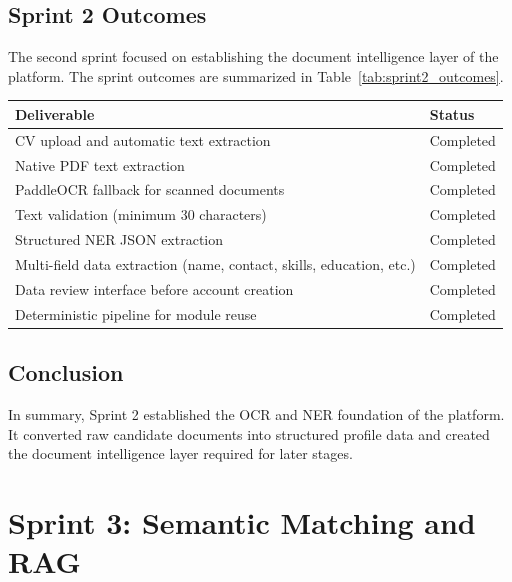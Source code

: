 \subsection{Sprint 2 Outcomes}
\label{sec:sprint2:outcomes}

The second sprint focused on establishing the document intelligence layer of the platform. The sprint outcomes are summarized in Table~\ref{tab:sprint2_outcomes}.

\begin{center}
\label{tab:sprint2_outcomes}
\renewcommand{\arraystretch}{0.8}
\begin{tabular}{|l|l|}
\hline
\rowcolor{gray!20} \textbf{Deliverable} & \textbf{Status} \\
\hline
CV upload and automatic text extraction & Completed \\
\hline
Native PDF text extraction & Completed \\
\hline
PaddleOCR fallback for scanned documents & Completed \\
\hline
Text validation (minimum 30 characters) & Completed \\
\hline
Structured NER JSON extraction & Completed \\
\hline
Multi-field data extraction (name, contact, skills, education, etc.) & Completed \\
\hline
Data review interface before account creation & Completed \\
\hline
Deterministic pipeline for module reuse & Completed \\
\hline
\end{tabular}
\end{center}

\subsection{Conclusion}
In summary, Sprint 2 established the OCR and NER foundation of the platform. It converted raw candidate documents into structured profile data and created the document intelligence layer required for later stages.

\section{Sprint 3: Semantic Matching and RAG} \label{chap4:sec3}

